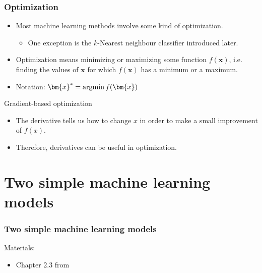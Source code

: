 \documentclass[notes]{beamer}          %
\newcommand{\vect}[1]{\bm{#1}}
\newcommand{\argmin}{\operatornamewithlimits{argmin}}
\begin{document}
\begin{frame}
\frametitle{Optimization}

\begin{itemize}
    \item Most machine learning methods involve some kind of optimization.
    \begin{itemize}
        \item One exception is the $k$-Nearest neighbour classifier introduced later.
    \end{itemize}
    \item Optimization means minimizing or maximizing some function $f(\vect{x})$, i.e. finding the values of $\vect{x}$ for which $f(\vect{x})$ has a minimum or a maximum.
    \item Notation: $\vect{x}^* = \argmin f(\vect{x})$
\end{itemize}
\end{frame}


\begin{frame}{Gradient-based optimization}

\begin{itemize}
    \item The derivative tells us how to change $x$ in order to make a small improvement of $f(x)$.
    \item Therefore, derivatives can be useful in optimization.


\end{itemize}
\end{frame}


\section{Two simple machine learning models}


\begin{frame}
\frametitle{Two simple machine learning models}
Materials:
\begin{itemize}
    \item Chapter 2.3 from \cite{elements}
\end{itemize}

\end{frame}
\end{document}
